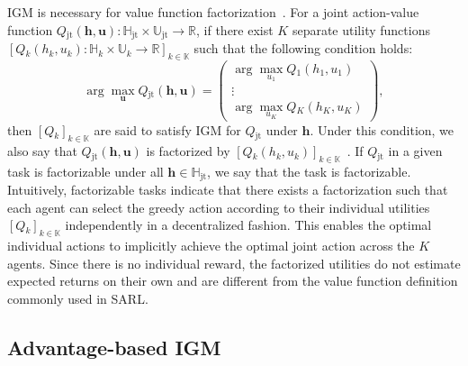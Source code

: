 \documentclass[twoside,11pt]{article}
\newcommand{\jointactionspace}{\mathbb{U}}
\newcommand{\jointaction}{\mathbf{u}}
\newcommand{\action}{u}
\newcommand{\jointobservationhistoryspace}{\mathbb{H}}
\newcommand{\jointobservationhistory}{\mathbf{h}}
\newcommand{\observationhistory}{h}
\newcommand{\agentspace}{\mathbb{K}}
\newcommand{\agentcounter}{k}
\newcommand{\numberofagents}{K}
\newcommand{\utilityexp}{Q}
\newcommand{\joint}{\mathrm{jt}}
\newcounter{definition0}
\begin{document}
IGM is necessary for value function factorization~\citep{Son2019QTRAN}. For a joint action-value function $\utilityexp{}_{\joint{}}(\jointobservationhistory{},\jointaction{}): \jointobservationhistoryspace_{\joint} \times \jointactionspace_{\joint} \rightarrow\mathbb{R}$, if there exist $\numberofagents{}$ separate utility functions $[\utilityexp{}_\agentcounter{}(\observationhistory{}_\agentcounter{},\action{}_\agentcounter{}): \jointobservationhistoryspace{}_{\agentcounter{}} \times \jointactionspace{}_{\agentcounter{}} \rightarrow\mathbb{R}]_{\agentcounter{}\in\agentspace{}}$ such that the following condition holds:
\begin{equation}
\arg\max_\jointaction{} \utilityexp{}_{\joint{}}(\jointobservationhistory{},\jointaction{}) =
\begin{pmatrix}
\arg\max_{\action{}_1} \utilityexp{}_1(\observationhistory{}_1,\action{}_1)\\
\vdots \\
\arg\max_{\action{}_\numberofagents{}} \utilityexp{}_\numberofagents{}(\observationhistory{}_\numberofagents{},\action{}_\numberofagents{})
\end{pmatrix},
\label{eq:igm}
\end{equation}
then $[\utilityexp{}_\agentcounter{}]_{\agentcounter{}\in\agentspace{}}$ are said to satisfy IGM for $\utilityexp{}_{\joint{}}$ under $\jointobservationhistory{}$. 
Under this condition, we also say that $\utilityexp{}_{\joint{}}(\jointobservationhistory{},\jointaction{})$ is factorized by $[\utilityexp{}_\agentcounter{}(\observationhistory{}_\agentcounter{},\action{}_\agentcounter{})]_{\agentcounter{}\in\agentspace{}}$~\citep{Son2019QTRAN}. If $\utilityexp{}_{\joint{}}$ in a given task is factorizable under all $\jointobservationhistory{}\in \jointobservationhistoryspace_{\joint}$, we say that the task is factorizable. Intuitively, factorizable tasks indicate that there exists a factorization such that each agent can select the greedy action according to their individual utilities $[\utilityexp{}_\agentcounter{}]_{\agentcounter{}\in\agentspace{}}$ independently in a decentralized fashion. This enables the optimal individual actions to implicitly achieve the optimal joint action across the $\numberofagents{}$ agents. Since there is no individual reward, the factorized utilities do not estimate expected returns on their own \citep{Guestrin2001Utility} and are different from the value function definition commonly used in SARL.



\subsection{Advantage-based IGM}
\label{subsec:advantage_based_igm}
\end{document}
